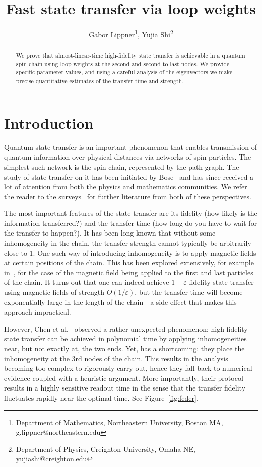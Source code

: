 \documentclass{article}
\title{Fast state transfer via loop weights}
\author{Gabor Lippner\footnote{Department of Mathematics, Northeastern University, Boston MA, g.lippner@northeastern.edu}, Yujia Shi\footnote{Department of Physics, Creighton University, Omaha NE, yujiashi@creighton.edu}}
\theoremstyle{definition}
\numberwithin{equation}{section}
\numberwithin{theorem}{section}
\newcommand{\ep}{\varepsilon}
\begin{document}
\maketitle
\begin{abstract}
    We prove that almost-linear-time high-fidelity state transfer is achievable in a quantum spin chain using loop weights at the second and second-to-last nodes. We provide specific parameter values, and using a careful analysis of the eigenvectors we make precise quantitative estimates of the transfer time and strength.
\end{abstract}

\section{Introduction}

Quantum state transfer is an important phenomenon that enables transmission of quantum information over physical distances via networks of spin particles. The simplest such network is the spin chain, represented by the path graph. The study of state transfer on it has been initiated by Bose~\cite{bose2003} and has since received a lot of attention from both the physics and mathematics communities. We refer the reader to the surveys~\cite{kay2010, QST} for further literature from both of these perspectives.

The most important features of the state transfer are its fidelity (how likely is the information transferred?) and the transfer time (how long do you have to wait for the transfer to happen?). It has been long known that without some inhomogeneity in the chain, the transfer strength cannot typically be arbitrarily close to 1. One such way of introducing inhomogeneity is to apply magnetic fields at certain positions of the chain. This has been explored extensively, for example in~\cite{christandl2005,stolze2012,casaccino2009,path}, for the case of the magnetic field being applied to the first and last particles of the chain. It turns out that one can indeed achieve $1-\ep$ fidelity state transfer using magnetic fields of strength $O(1/\ep)$, but the transfer time will become exponentially large in the length of the chain - a side-effect that makes this approach impractical. 

However, Chen et al.~\cite{chen2016} observed a rather unexpected phenomenon: high fidelity state transfer can be achieved in polynomial time by applying inhomogeneities near, but not exactly at, the two ends.  
Yet, \cite{chen2016} has a shortcoming: they place the inhomogeneity at the 3rd nodes of the chain. This results in the analysis becoming too complex to rigorously carry out, hence they fall back to numerical evidence coupled with a heuristic argument. More importantly, their protocol results in a highly sensitive readout time in the sense that the transfer fidelity fluctuates rapidly near the optimal time. See Figure~\ref{fig:feder}.
\end{document}
